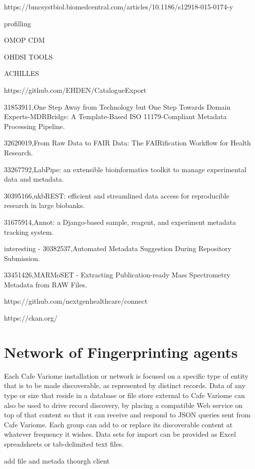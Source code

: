 https://bmcsystbiol.biomedcentral.com/articles/10.1186/s12918-015-0174-y

\cite{maelstrom}
\cite{gaain}

profilling

OMOP CDM

OHDSI TOOLS 

ACHILLES

https://github.com/EHDEN/CatalogueExport

31853911,One Step Away from Technology but One Step Towards Domain Experts-MDRBridge: A Template-Based ISO 11179-Compliant Metadata Processing Pipeline.

32620019,From Raw Data to FAIR Data: The FAIRification Workflow for Health Research.

33267792,LabPipe: an extensible bioinformatics toolkit to manage experimental data and metadata.

30395166,ukbREST: efficient and streamlined data access for reproducible research in large biobanks.

31675914,Annot: a Django-based sample, reagent, and experiment metadata tracking system.

interesting - 30382537,Automated Metadata Suggestion During Repository Submission.

33451426,MARMoSET - Extracting Publication-ready Mass Spectrometry Metadata from RAW Files.

https://github.com/nextgenhealthcare/connect

https://ckan.org/

\section{Network of Fingerprinting agents}
\cite{cafevariome}
Each Cafe Variome installation or network is focused on a specific type of entity that
is to be made discoverable, as represented by distinct records. Data of
any type or size that reside in a database or file store external to Cafe Variome can
also be used to drive record discovery, by placing a compatible Web service on top of
that content so that it can receive and respond to JSON queries sent from Cafe Variome.
Each group can add to or replace its discoverable content at whatever frequency it
wishes. Data sets for import can be provided as Excel spreadsheets or tab-delimited text files.


\cite{egenvar}
add file and metada thourgh client

